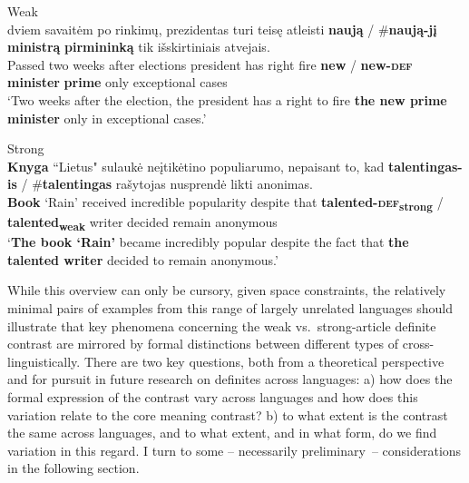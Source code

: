 \documentclass[output=paper
,modfonts
,nonflat]{langscibook}
\begin{document}
\begin{exe}
\ex\label{ex:schwarz:21} 
\begin{xlist}
\ex Weak\\ 
 {dviem} {savaitėm} {po} {rinkimų}, {prezidentas} {turi} {teisę} {atleisti} \textbf{naują} \textnormal{/} \textnormal{\#}\textbf{naują-jį} \textbf{ministrą} \textbf{pirmininką} {tik} {išskirtiniais} {atvejais}.\\
Passed two weeks after elections president has right fire \textbf{new} / \phantom{\#}\textbf{new-\textsc{def}} \textbf{minister} \textbf{prime} only exceptional cases\\
\glt `Two weeks after the election, the president has a right to fire \textbf{the new prime minister} only in exceptional cases.'

\ex Strong\\ 
\gll \textbf{Knyga} ``{Lietus}" {sulaukė} {neįtikėtino} {populiarumo}, {nepaisant} {to}, {kad} \textbf{talentingas-is} \textnormal{/} \textnormal{\#}\textbf{talentingas} {rašytojas} {nusprendė} {likti} {anonimas}.\\
\textbf{Book} `Rain' received incredible popularity despite {} that \textbf{talented-\textsc{def}\textsubscript{strong}} / \phantom{\#}\textbf{talented\textsubscript{weak}} writer decided remain anonymous\\
\trans `\textbf{The book `Rain'} became incredibly popular despite the
fact that \textbf{the talented writer} decided to remain anonymous.' 
\end{xlist}
\end{exe}

While this overview can only be cursory, given space constraints, the
relatively minimal pairs of examples from this range of largely
unrelated languages should illustrate that key phenomena concerning the weak
vs.\ strong-article definite contrast are mirrored by formal
distinctions between different types of 
cross-linguistically. There are two key questions, both from a theoretical
perspective and for pursuit in future research on definites across
languages: a) how does the formal expression of the contrast vary across
languages and how does this variation relate to the core meaning contrast?
b) to what extent is the contrast the same across languages, and
to what extent, and in what form, do we find variation in this regard. I
turn to some -- necessarily preliminary~-- considerations in the
following section.
\end{document}

